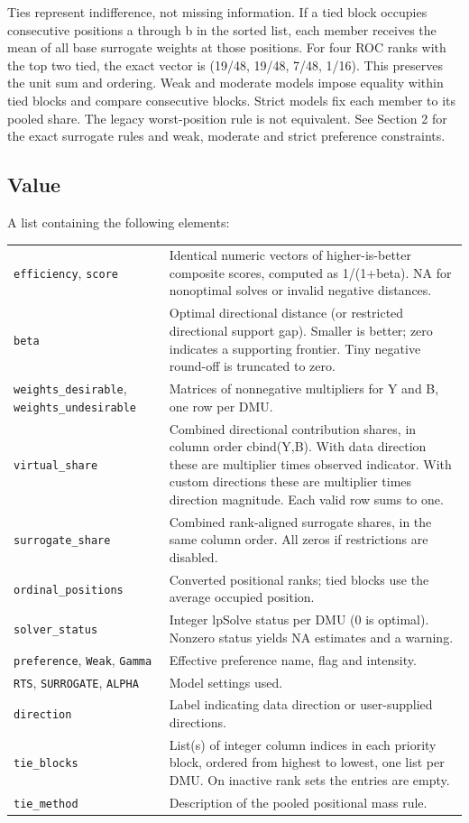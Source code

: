 \documentclass[10pt,a4paper]{article}
\newcommand{\field}[1]{\needspace{3\baselineskip}\subsection*{#1}}
\begin{document}
Ties represent indifference, not missing information. If a tied block occupies consecutive positions a through b in the sorted list, each member receives the mean of all base surrogate weights at those positions. For four ROC ranks with the top two tied, the exact vector is (19/48, 19/48, 7/48, 1/16). This preserves the unit sum and ordering. Weak and moderate models impose equality within tied blocks and compare consecutive blocks. Strict models fix each member to its pooled share. The legacy worst-position rule is not equivalent.
See Section 2 for the exact surrogate rules and weak, moderate and strict preference constraints.
\field{Value}
A list containing the following elements:
\begin{longtable}{@{}p{53mm}p{106mm}@{}}
\texttt{efficiency}, \texttt{score} & Identical numeric vectors of higher-is-better composite scores, computed as 1/(1+beta). NA for nonoptimal solves or invalid negative distances. \\[2pt]
\texttt{beta} & Optimal directional distance (or restricted directional support gap). Smaller is better; zero indicates a supporting frontier. Tiny negative round-off is truncated to zero. \\[2pt]
\texttt{weights\_desirable}, \texttt{weights\_undesirable} & Matrices of nonnegative multipliers for Y and B, one row per DMU. \\[2pt]
\texttt{virtual\_share} & Combined directional contribution shares, in column order cbind(Y,B). With data direction these are multiplier times observed indicator. With custom directions these are multiplier times direction magnitude. Each valid row sums to one. \\[2pt]
\texttt{surrogate\_share} & Combined rank-aligned surrogate shares, in the same column order. All zeros if restrictions are disabled. \\[2pt]
\texttt{ordinal\_positions} & Converted positional ranks; tied blocks use the average occupied position. \\[2pt]
\texttt{solver\_status} & Integer lpSolve status per DMU (0 is optimal). Nonzero status yields NA estimates and a warning. \\[2pt]
\texttt{preference}, \texttt{Weak}, \texttt{Gamma} & Effective preference name, flag and intensity. \\[2pt]
\texttt{RTS}, \texttt{SURROGATE}, \texttt{ALPHA} & Model settings used. \\[2pt]
\texttt{direction} & Label indicating data direction or user-supplied directions. \\[2pt]
\texttt{tie\_blocks} & List(s) of integer column indices in each priority block, ordered from highest to lowest, one list per DMU. On inactive rank sets the entries are empty. \\[2pt]
\texttt{tie\_method} & Description of the pooled positional mass rule. \\[2pt]
\end{longtable}
\end{document}
